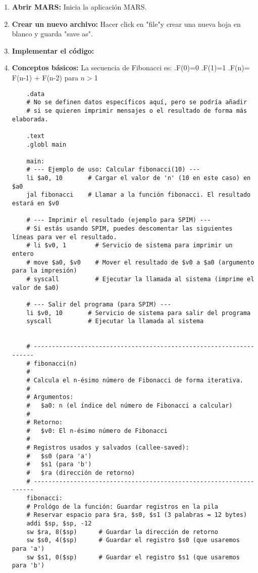 \documentclass{article}
\begin{document}
\begin{enumerate}
    \item \textbf{Abrir MARS:} Inicia la aplicación MARS.
    \item \textbf{Crear un nuevo archivo:} Hacer click en "file"y crear una nueva hoja en blanco y guarda "save as".
    \item \textbf{Implementar el código: } 
    \item \textbf{Conceptos básicos: } La secuencia de Fibonacci es: 
    .F(0)=0 
    .F(1)=1
    .F(n)= F(n-1) + F(n-2) para $n > $1

    \begin{verbatim}
    .data
    # No se definen datos específicos aquí, pero se podría añadir
    # si se quieren imprimir mensajes o el resultado de forma más elaborada.
    
    .text
    .globl main
    
    main:
    # --- Ejemplo de uso: Calcular fibonacci(10) ---
    li $a0, 10       # Cargar el valor de 'n' (10 en este caso) en $a0
    jal fibonacci    # Llamar a la función fibonacci. El resultado estará en $v0
    
    # --- Imprimir el resultado (ejemplo para SPIM) ---
    # Si estás usando SPIM, puedes descomentar las siguientes líneas para ver el resultado.
    # li $v0, 1        # Servicio de sistema para imprimir un entero
    # move $a0, $v0    # Mover el resultado de $v0 a $a0 (argumento para la impresión)
    # syscall          # Ejecutar la llamada al sistema (imprime el valor de $a0)
    
    # --- Salir del programa (para SPIM) ---
    li $v0, 10       # Servicio de sistema para salir del programa
    syscall          # Ejecutar la llamada al sistema
    
    
    # -------------------------------------------------------------------
    # fibonacci(n)
    #
    # Calcula el n-ésimo número de Fibonacci de forma iterativa.
    #
    # Argumentos:
    #   $a0: n (el índice del número de Fibonacci a calcular)
    #
    # Retorno:
    #   $v0: El n-ésimo número de Fibonacci
    #
    # Registros usados y salvados (callee-saved):
    #   $s0 (para 'a')
    #   $s1 (para 'b')
    #   $ra (dirección de retorno)
    # -------------------------------------------------------------------
    fibonacci:
    # Prológo de la función: Guardar registros en la pila
    # Reservar espacio para $ra, $s0, $s1 (3 palabras = 12 bytes)
    addi $sp, $sp, -12
    sw $ra, 8($sp)      # Guardar la dirección de retorno
    sw $s0, 4($sp)      # Guardar el registro $s0 (que usaremos para 'a')
    sw $s1, 0($sp)      # Guardar el registro $s1 (que usaremos para 'b')
    

\end{verbatim}
\end{enumerate}
\end{document}
